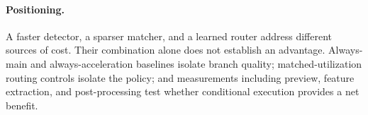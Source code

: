 \paragraph{Positioning.}
A faster detector, a sparser matcher, and a learned router address different sources of cost.
Their combination alone does not establish an advantage. Always-main and always-acceleration
baselines isolate branch quality; matched-utilization routing controls isolate the policy;
and measurements including preview, feature extraction, and post-processing test whether
conditional execution provides a net benefit.

